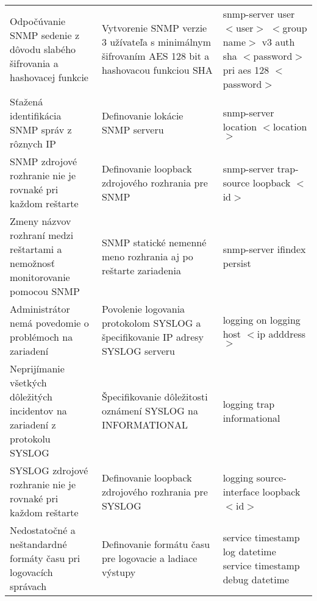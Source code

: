 \begin{longtable}[!htbp]{|L{10em}L{10em}L{34em}|}
	
	
	
	 Odpočúvanie SNMP sedenie z dôvodu slabého šifrovania a hashovacej  funkcie	&Vytvorenie SNMP verzie 3 užívateľa s minimálnym šifrovaním AES 128 bit a hashovacou funkciou SHA	&snmp-server user $<$user$>$ $<$group name$>$ v3 auth sha $<$password$>$ pri aes 128 $<$password$>$\\
	
	
	
	
	Sťažená identifikácia SNMP správ z rôznych IP	&Definovanie lokácie SNMP serveru	&snmp-server location $<$location$>$\\
	
	
	
	
	 SNMP zdrojové rozhranie nie je rovnaké pri každom reštarte	& Definovanie loopback zdrojového rozhrania pre SNMP	&snmp-server trap-source loopback $<$id$>$\\
	
	
	
	
	Zmeny názvov rozhraní medzi reštartami a nemožnosť monitorovanie pomocou SNMP	&SNMP statické nemenné meno rozhrania aj po reštarte zariadenia	&snmp-server ifindex persist\\
	
	
	
	
	 Administrátor nemá povedomie o problémoch na zariadení	&Povolenie logovania protokolom SYSLOG a špecifikovanie IP adresy SYSLOG serveru	&logging on
	logging host $<$ip adddress$>$\\
	
	
	
	
	Neprijímanie všetkých dôležitých incidentov na zariadení z protokolu SYSLOG	&Špecifikovanie dôležitosti oznámení SYSLOG na INFORMATIONAL	&logging trap informational\\
	
	
	
	
	 SYSLOG zdrojové rozhranie nie je rovnaké pri každom reštarte	& Definovanie loopback zdrojového rozhrania pre SYSLOG	&logging source-interface loopback $<$id$>$\\
	
	
	
	Nedostatočné a neštandardné formáty času pri logovacích správach	&Definovanie formátu času pre logovacie a ladiace výstupy	&service timestamp log datetime
	service timestamp debug datetime\\
	

\end{longtable}
